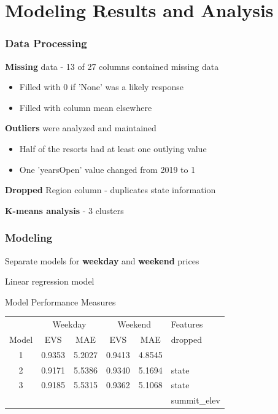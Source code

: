 \documentclass{beamer}
\begin{document}
\section{Modeling Results and Analysis } %
\begin{frame}
\frametitle{Data Processing}
\textbf{Missing} data - 13 of 27 columns contained missing data
\begin{itemize}
\item Filled with 0 if 'None' was a likely response
\item Filled with column mean elsewhere
\end{itemize}
\textbf{Outliers} were analyzed and maintained
\begin{itemize}
\item Half of the resorts had at least one outlying value
\item One 'yearsOpen' value changed from 2019 to 1
\end{itemize}
\textbf{Dropped} Region column - duplicates state information

\textbf{K-means analysis} - 3 clusters
\end{frame}
\begin{frame}
\frametitle{Modeling}
Separate models for \textbf{weekday} and \textbf{weekend} prices

Linear regression model

\begin{block} {Model Performance Measures}
\begin{table}[h]
\begin{center}
\begin{tabular} {c | c | c | c | c | l }
& \multicolumn{2}{c}{Weekday} & \multicolumn{2}{c}{Weekend} & Features\\
Model& EVS & MAE & EVS & MAE & dropped\\ \hline
1 & 0.9353 & 5.2027 & 0.9413 & 4.8545 & \\ \hline
2 & 0.9171 & 5.5386 & 0.9340 & 5.1694 & state \\ \hline
3 & 0.9185 & 5.5315 & 0.9362 & 5.1068 & state \\
& & & & &  summit\_elev \\ \hline
\end{tabular}
\label{tab:perform}
\end{center}
\end{table}
\end{block}
\end{frame}
\end{document}
